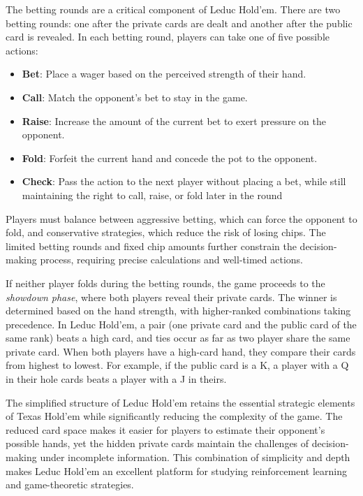 \documentclass{article}
\begin{document}
The betting rounds are a critical component of Leduc Hold'em. There are two betting rounds: one after the private cards are dealt and another after the public card is revealed. In each betting round, players can take one of five possible actions:
\begin{itemize}
    \item \textbf{Bet}: Place a wager based on the perceived strength of their hand.
    \item \textbf{Call}: Match the opponent's bet to stay in the game.
    \item \textbf{Raise}: Increase the amount of the current bet to exert pressure on the opponent.
    \item \textbf{Fold}: Forfeit the current hand and concede the pot to the opponent.
    \item \textbf{Check}: Pass the action to the next player without placing a bet, while still maintaining the right to call, raise, or fold later in the round
\end{itemize}
Players must balance between aggressive betting, which can force the opponent to fold, and conservative strategies, which reduce the risk of losing chips. The limited betting rounds and fixed chip amounts further constrain the decision-making process, requiring precise calculations and well-timed actions.

If neither player folds during the betting rounds, the game proceeds to the \textit{showdown phase}, where both players reveal their private cards. The winner is determined based on the hand strength, with higher-ranked combinations taking precedence. In Leduc Hold'em, a pair (one private card and the public card of the same rank) beats a high card, and ties occur as far as two player share the same private card. When both players have a high-card hand, they compare their cards from highest to lowest. For example, if the public card is a K, a player with a Q in their hole cards beats a player with a J in theirs.

The simplified structure of Leduc Hold'em retains the essential strategic elements of Texas Hold'em while significantly reducing the complexity of the game. The reduced card space makes it easier for players to estimate their opponent's possible hands, yet the hidden private cards maintain the challenges of decision-making under incomplete information. This combination of simplicity and depth makes Leduc Hold'em an excellent platform for studying reinforcement learning and game-theoretic strategies.
\end{document}
